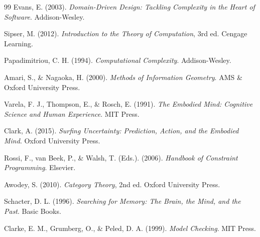 \documentclass[11pt, a4paper]{article}
\theoremstyle{named}
\begin{document}
\begin{thebibliography}{99}
Evans, E. (2003).
\textit{Domain-Driven Design: Tackling Complexity in the Heart of Software}.
Addison-Wesley.

Sipser, M. (2012).
\textit{Introduction to the Theory of Computation}, 3rd ed.
Cengage Learning.

Papadimitriou, C. H. (1994).
\textit{Computational Complexity}.
Addison-Wesley.

Amari, S., \& Nagaoka, H. (2000).
\textit{Methods of Information Geometry}.
AMS \& Oxford University Press.

Varela, F. J., Thompson, E., \& Rosch, E. (1991).
\textit{The Embodied Mind: Cognitive Science and Human Experience}.
MIT Press.

Clark, A. (2015).
\textit{Surfing Uncertainty: Prediction, Action, and the Embodied Mind}.
Oxford University Press.

Rossi, F., van Beek, P., \& Walsh, T. (Eds.). (2006).
\textit{Handbook of Constraint Programming}.
Elsevier.

Awodey, S. (2010).
\textit{Category Theory}, 2nd ed.
Oxford University Press.

Schacter, D. L. (1996).
\textit{Searching for Memory: The Brain, the Mind, and the Past}.
Basic Books.

Clarke, E. M., Grumberg, O., \& Peled, D. A. (1999).
\textit{Model Checking}.
MIT Press.

\end{thebibliography}

\end{document}
